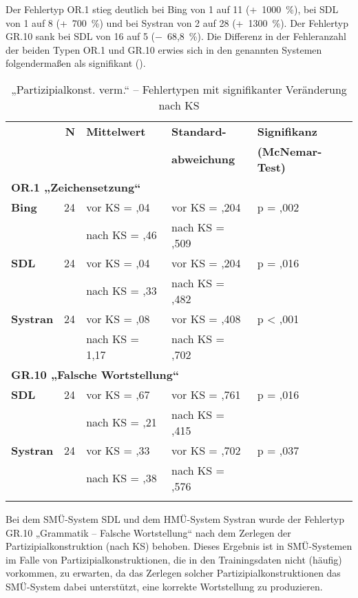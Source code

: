 Der Fehlertyp OR.1 stieg deutlich bei Bing von 1 auf 11 (+~1000~\%), bei SDL von 1 auf 8 (+~700~\%) und bei Systran von 2 auf 28 (+~1300~\%). Der Fehlertyp GR.10 sank bei SDL von 16 auf 5 ($-$~68,8~\%). Die Differenz in der Fehleranzahl der beiden Typen OR.1 und GR.10 erwies sich in den genannten Systemen folgendermaßen als signifikant ().


\begin{table}
\begin{tabularx}{.86\textwidth}{lrlll}

\lsptoprule
& \textbf{N} & \textbf{Mittelwert} & \textbf{Standard-} &{ \textbf{Signifikanz}}\\
& & & \textbf{abweichung} & \textbf{(McNemar-Test)}\\
\midrule
\multicolumn{5}{l}{\textbf{OR.1 „Zeichensetzung“}}\\
 \textbf{Bing} & 24 & vor KS = ,04 & vor KS = ,204 & p = ,002\\
& & nach KS = ,46 & nach KS = ,509 & \\
 \textbf{SDL} & 24 & vor KS = ,04 & vor KS = ,204 & p = ,016\\
& & nach KS = ,33 & nach KS = ,482 & \\
 \textbf{Systran} & 24 & vor KS = ,08 & vor KS = ,408 & p < ,001\\
& & nach KS = 1,17 & nach KS = ,702 & \\
\midrule
\multicolumn{5}{l}{\textbf{GR.10 „Falsche Wortstellung“}}\\
 \textbf{SDL} & 24 & vor KS = ,67 & vor KS = ,761 & p = ,016\\
& & nach KS = ,21 & nach KS = ,415 & \\
 \textbf{Systran} & 24 & vor KS = ,33 & vor KS = ,702 & p = ,037\\
& & nach KS = ,38 & nach KS = ,576 & \\
\lspbottomrule
\end{tabularx}
\caption{\label{tab:05:55}„Partizipialkonst. verm.“ -- Fehlertypen mit signifikanter Veränderung nach KS   }
\end{table}

Bei dem SMÜ-System SDL und dem HMÜ-System Systran wurde der Fehlertyp GR.10 „Grammatik -- Falsche Wortstellung“ nach dem Zerlegen der Partizipialkonstruktion (nach KS) behoben. Dieses Ergebnis ist in SMÜ-Systemen im Falle von Partizipialkonstruktionen, die in den Trainingsdaten nicht (häufig) vorkommen, zu erwarten, da das Zerlegen solcher Partizipialkonstruktionen das SMÜ-System dabei unterstützt, eine korrekte Wortstellung zu produzieren.


